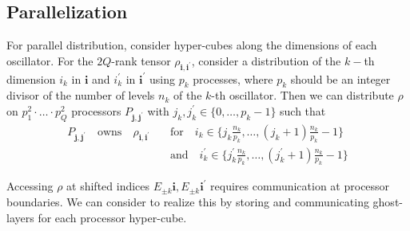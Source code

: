 \documentclass[letterpaper]{article}
\newcommand{\bfi}{\boldsymbol{i}}
\newcommand{\bfj}{\boldsymbol{j}}
\newcommand{\p}{\prime}
\begin{document}
 \subsection{Parallelization} 
 
 For parallel distribution, consider hyper-cubes along the dimensions of each
 oscillator. For the $2Q$-rank tensor $\rho_{\bfi, \bfi^\p}$, consider a
 distribution of the $k-$th dimension $i_k$ in $\bfi$ and $i_k^\p$ in $\bfi^\p$
 using $p_k$ processes, where $p_k$ should be an integer divisor of the number
 of levels $n_k$ of the $k$-th oscillator. Then we can distribute $\rho$ on
 $p_1^2\cdot \ldots \cdot p_Q^2$ processors $P_{\bfj, \bfj^\p}$ with $j_k,
 j_k^\p \in \{0,\dots,p_k-1\}$ such that
 \begin{align}
   P_{\bfj, \bfj^\p} \quad \text{owns} \quad \rho_{\bfi, \bfi^\p} \quad
   &\text{for} \quad i_k \in \{ j_k \frac{n_k}{p_k}, \dots, \left(j_k+1\right)
   \frac{n_k}{p_k} - 1 \}\\
    &\text{and} \quad i_k^\p \in \{ j_k^\p \frac{n_k}{p_k}, \dots,
    \left(j_k^\p+1\right) \frac{n_k}{p_k} - 1 \}
 \end{align}

 Accessing $\rho$ at shifted indices $E_{\pm k}\bfi, E_{\pm k}\bfi^\p$ requires
 communication at processor boundaries. We can consider to realize this by
 storing and communicating ghost-layers for each processor hyper-cube.
\end{document}
